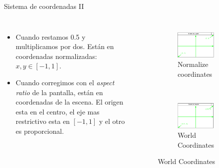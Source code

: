 \begin{frame}{Sistema de coordenadas II}
\begin{columns}
    \begin{itemize}
        \item Cuando restamos 0.5 y multiplicamos por dos. Están en coordenadas normalizadas: $x,y \in [-1, 1]$.
        \item Cuando corregimos con el \emph{aspect ratio} de la pantalla, están en coordenadas de la escena. El origen esta en el centro, el eje mas restrictivo esta en $[-1, 1]$ y el otro es proporcional.
     \end{itemize}
\begin{figure}[htp]
 \centering
 \begin{subfigure}[b]{0.45\textwidth}
   \includegraphics[width=\textwidth]{img/FoRNormalized}
   \caption{Normalize coordinates}
 \end{subfigure}
\\
 \begin{subfigure}[b]{0.45\textwidth}
   \includegraphics[width=\textwidth]{img/FoRCorrected}
   \caption{World Coordinates}
 \end{subfigure}
\end{figure}
\end{columns}
\end{frame}

